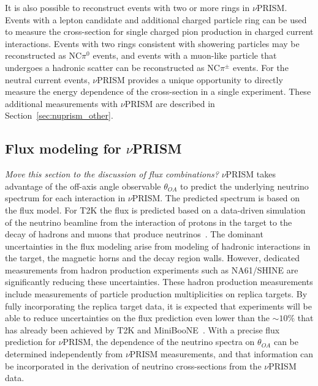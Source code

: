 It is also possible to reconstruct events with two or more rings in $\nu$PRISM.  Events with a lepton candidate and additional 
charged particle ring can be used to measure the cross-section for single charged pion production in charged current interactions.
Events with two rings consistent with showering particles may be reconstructed as NC$\pi^{0}$ events, and events with a muon-like
particle that undergoes a hadronic scatter can be reconstructed as NC$\pi^{\pm}$ events.   For the neutral current events,
$\nu$PRISM provides a unique opportunity to directly measure the energy dependence of the cross-section in a single experiment.
These additional measurements with $\nu$PRISM are described in Section~\ref{sec:nuprism_other}.




\subsection{Flux modeling for $\nu$PRISM}
{\color{red} \it Move this section to the discussion of flux combinations? }
$\nu$PRISM takes advantage of the off-axis angle observable $\theta_{OA}$ to predict the underlying neutrino spectrum
for each interaction in $\nu$PRISM.  The predicted spectrum is based on the flux model.  For T2K the flux is predicted
based on a data-driven simulation of the neutrino beamline from the interaction of protons in the target to the decay of
hadrons and muons that produce neutrinos~\cite{Abe:2012av}.  The dominant uncertainties in the flux modeling arise from
modeling of hadronic interactions in the target, the magnetic horns and the decay region walls.  However, dedicated 
measurements from hadron production experiments such as NA61/SHINE are significantly reducing these uncertainties.  
These hadron production measurements include measurements of particle production multiplicities on replica targets.
By fully incorporating the replica target data, it is expected that experiments will be able to reduce uncertainties on the
flux prediction even lower than the $\sim10\%$ that has already been achieved by T2K and MiniBooNE~\cite{AguilarArevalo:2008yp}.  
With a precise 
flux prediction for $\nu$PRISM, the dependence of the neutrino spectra on $\theta_{OA}$ can be determined independently 
from $\nu$PRISM measurements, and that information can be incorporated in the derivation of neutrino cross-sections from the
$\nu$PRISM data. 
